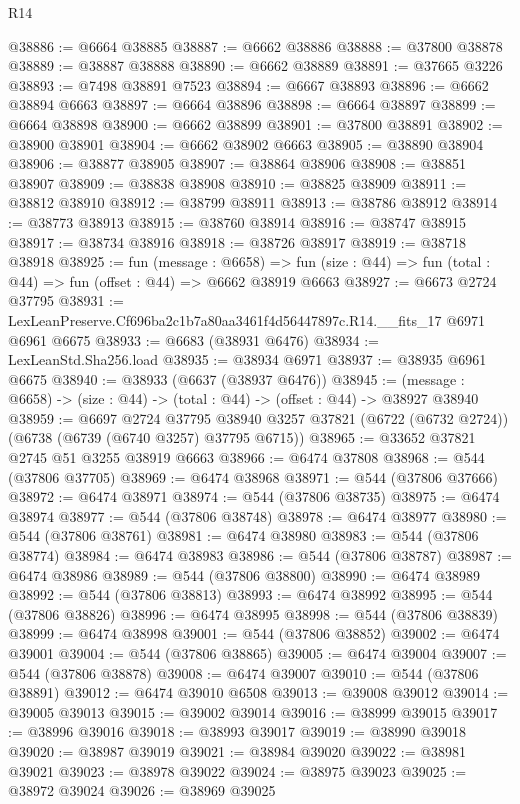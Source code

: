 \begin{lexlean}{R14}
\begin{coremodule}
@38886 := @6664 @38885
@38887 := @6662 @38886
@38888 := @37800 @38878
@38889 := @38887 @38888
@38890 := @6662 @38889
@38891 := @37665 @3226
@38893 := @7498 @38891 @7523
@38894 := @6667 @38893
@38896 := @6662 @38894 @6663
@38897 := @6664 @38896
@38898 := @6664 @38897
@38899 := @6664 @38898
@38900 := @6662 @38899
@38901 := @37800 @38891
@38902 := @38900 @38901
@38904 := @6662 @38902 @6663
@38905 := @38890 @38904
@38906 := @38877 @38905
@38907 := @38864 @38906
@38908 := @38851 @38907
@38909 := @38838 @38908
@38910 := @38825 @38909
@38911 := @38812 @38910
@38912 := @38799 @38911
@38913 := @38786 @38912
@38914 := @38773 @38913
@38915 := @38760 @38914
@38916 := @38747 @38915
@38917 := @38734 @38916
@38918 := @38726 @38917
@38919 := @38718 @38918
@38925 := fun (message : @6658) =>
  fun (size : @44) => fun (total : @44) => fun (offset : @44) => @6662 @38919 @6663
@38927 := @6673 @2724 @37795
@38931 := LexLeanPreserve.Cf696ba2c1b7a80aa3461f4d56447897c.R14.__fits_17 @6971 @6961 @6675
@38933 := @6683 (@38931 @6476)
@38934 := LexLeanStd.Sha256.load
@38935 := @38934 @6971
@38937 := @38935 @6961 @6675
@38940 := @38933 (@6637 (@38937 @6476))
@38945 := (message : @6658) -> (size : @44) -> (total : @44) -> (offset : @44) -> @38927 @38940
@38959 := @6697
    @2724
    @37795
    @38940
    @3257
    @37821
    (@6722 (@6732 @2724))
    (@6738 (@6739 (@6740 @3257) @37795 @6715))
@38965 := @33652 @37821 @2745 @51 @3255 @38919 @6663
@38966 := @6474 @37808
@38968 := @544 (@37806 @37705)
@38969 := @6474 @38968
@38971 := @544 (@37806 @37666)
@38972 := @6474 @38971
@38974 := @544 (@37806 @38735)
@38975 := @6474 @38974
@38977 := @544 (@37806 @38748)
@38978 := @6474 @38977
@38980 := @544 (@37806 @38761)
@38981 := @6474 @38980
@38983 := @544 (@37806 @38774)
@38984 := @6474 @38983
@38986 := @544 (@37806 @38787)
@38987 := @6474 @38986
@38989 := @544 (@37806 @38800)
@38990 := @6474 @38989
@38992 := @544 (@37806 @38813)
@38993 := @6474 @38992
@38995 := @544 (@37806 @38826)
@38996 := @6474 @38995
@38998 := @544 (@37806 @38839)
@38999 := @6474 @38998
@39001 := @544 (@37806 @38852)
@39002 := @6474 @39001
@39004 := @544 (@37806 @38865)
@39005 := @6474 @39004
@39007 := @544 (@37806 @38878)
@39008 := @6474 @39007
@39010 := @544 (@37806 @38891)
@39012 := @6474 @39010 @6508
@39013 := @39008 @39012
@39014 := @39005 @39013
@39015 := @39002 @39014
@39016 := @38999 @39015
@39017 := @38996 @39016
@39018 := @38993 @39017
@39019 := @38990 @39018
@39020 := @38987 @39019
@39021 := @38984 @39020
@39022 := @38981 @39021
@39023 := @38978 @39022
@39024 := @38975 @39023
@39025 := @38972 @39024
@39026 := @38969 @39025

\end{coremodule}
\end{lexlean}
